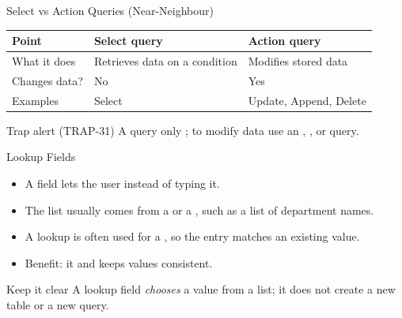 \documentclass[aspectratio=169]{beamer}
\begin{document}
\begin{frame}{Select vs Action Queries (Near-Neighbour)}
  \begin{center}
    \begin{tabular}{p{}p{}p{}}
      \toprule
      \textbf{Point} & \textbf{Select query} & \textbf{Action query} \\
      \midrule
      What it does & Retrieves data on a condition & Modifies stored data \\
      Changes data? & No & Yes \\
      Examples & Select & Update, Append, Delete \\
      \bottomrule
    \end{tabular}
  \end{center}
  \vspace{0.25cm}
  \begin{alertblock}{Trap alert (TRAP-31)}
    A  query only ; to modify data use an
    , , or  query.
  \end{alertblock}
\end{frame}

\begin{frame}{Lookup Fields}
  \begin{itemize}
    \item A  field lets the user 
      instead of typing it.
    \item The list usually comes from a  or a , such
      as a list of department names.
    \item A lookup is often used for a , so the entry
      matches an existing value.
    \item Benefit: it  and keeps values
      consistent.
  \end{itemize}
  \begin{block}{Keep it clear}
    A lookup field \emph{chooses} a value from a list; it does not create a
    new table or a new query.
  \end{block}
\end{frame}
\end{document}
